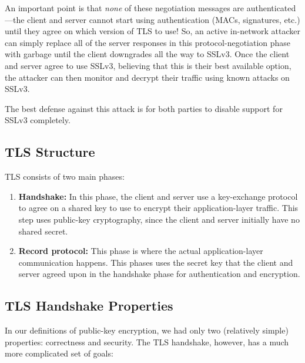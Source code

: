 \documentclass[
  letterpaper,
]{scrbook}
\newcounter{none} %
\providecommand{\tightlist}{%
  \setlength{\itemsep}{0pt}\setlength{\parskip}{0pt}}
\theoremstyle{definition}
\theoremstyle{plain}
\theoremstyle{plain}
\theoremstyle{remark}
\begin{document}
An important point is that \emph{none} of these negotiation messages are
authenticated---the client and server cannot start using authentication
(MACs, signatures, etc.) until they agree on which version of TLS to
use! So, an active in-network attacker can simply replace all of the
server responses in this protocol-negotiation phase with garbage until
the client downgrades all the way to SSLv3. Once the client and server
agree to use SSLv3, believing that this is their best available option,
the attacker can then monitor and decrypt their traffic using known
attacks on SSLv3.

The best defense against this attack is for both parties to disable
support for SSLv3 completely.

\subsection{TLS Structure}\label{tls-structure}

TLS consists of two main phases:

\begin{enumerate}
\def\labelenumi{\arabic{enumi}.}
\tightlist
\item
  \textbf{Handshake:} In this phase, the client and server use a
  key-exchange protocol to agree on a shared key to use to encrypt their
  application-layer traffic. This step uses public-key cryptography,
  since the client and server initially have no shared secret.
\item
  \textbf{Record protocol:} This phase is where the actual
  application-layer communication happens. This phases uses the secret
  key that the client and server agreed upon in the handshake phase for
  authentication and encryption.
\end{enumerate}

\subsection{TLS Handshake Properties}\label{tls-handshake-properties}

In our definitions of public-key encryption, we had only two (relatively
simple) properties: correctness and security. The TLS handshake,
however, has a much more complicated set of goals:
\end{document}
